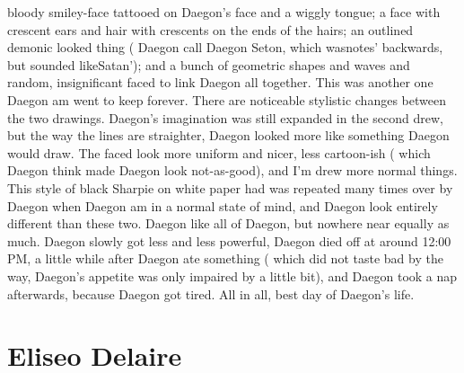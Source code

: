 \documentclass[12pt]{book}
\begin{document}
bloody smiley-face tattooed on Daegon's face and a wiggly tongue; a face with crescent ears and hair with crescents on the ends of the hairs; an outlined demonic looked thing ( Daegon call Daegon Seton, which wasnotes' backwards, but sounded likeSatan'); and a bunch of geometric shapes and waves and random, insignificant faced to link Daegon all together. This was another one Daegon am went to keep forever. There are noticeable stylistic changes between the two drawings. Daegon's imagination was still expanded in the second drew, but the way the lines are straighter, Daegon looked more like something Daegon would draw. The faced look more uniform and nicer, less cartoon-ish ( which Daegon think made Daegon look not-as-good), and I'm drew more normal things. This style of black Sharpie on white paper had was repeated many times over by Daegon when Daegon am in a normal state of mind, and Daegon look entirely different than these two. Daegon like all of Daegon, but nowhere near equally as much. Daegon slowly got less and less powerful, Daegon died off at around 12:00 PM, a little while after Daegon ate something ( which did not taste bad by the way, Daegon's appetite was only impaired by a little bit), and Daegon took a nap afterwards, because Daegon got tired. All in all, best day of Daegon's life.



\chapter{Eliseo Delaire}
\end{document}
